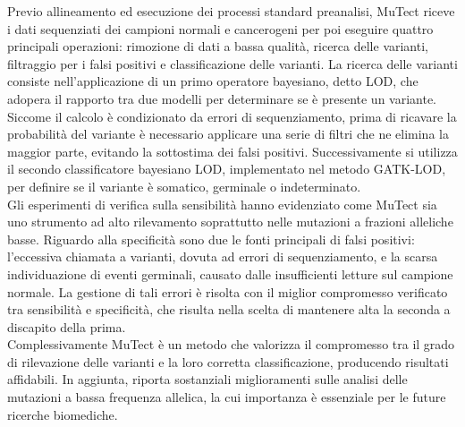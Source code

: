 Previo allineamento ed esecuzione dei processi standard preanalisi, MuTect riceve i dati sequenziati dei campioni normali e cancerogeni per poi eseguire quattro principali operazioni: rimozione di dati a bassa qualità, ricerca delle varianti, filtraggio per i falsi positivi e classificazione delle varianti. La ricerca delle varianti consiste nell'applicazione di un primo operatore bayesiano, detto LOD, che adopera il rapporto tra due modelli per determinare se è presente un variante. Siccome il calcolo è condizionato da errori di sequenziamento, prima di ricavare la probabilità del variante è necessario applicare una serie di filtri che ne elimina la maggior parte, evitando la sottostima dei falsi positivi. Successivamente si utilizza il secondo classificatore bayesiano LOD, implementato nel metodo GATK-LOD, per definire se il variante è somatico, germinale o indeterminato.\\ 
Gli esperimenti di verifica sulla sensibilità hanno evidenziato come MuTect sia uno strumento ad alto rilevamento soprattutto nelle mutazioni a frazioni alleliche basse. Riguardo alla specificità sono due le fonti principali di falsi positivi: l'eccessiva chiamata a varianti, dovuta ad errori di sequenziamento, e la scarsa individuazione di eventi germinali, causato dalle insufficienti letture sul campione normale. La gestione di tali errori è risolta con il miglior compromesso verificato tra sensibilità e specificità, che risulta nella scelta di mantenere alta la seconda a discapito della prima.\\
Complessivamente MuTect è un metodo che valorizza il compromesso tra il grado di rilevazione delle varianti e la loro corretta classificazione, producendo risultati affidabili. In aggiunta, riporta sostanziali miglioramenti sulle analisi delle mutazioni a bassa frequenza allelica, la cui importanza è essenziale per le future ricerche biomediche.  

